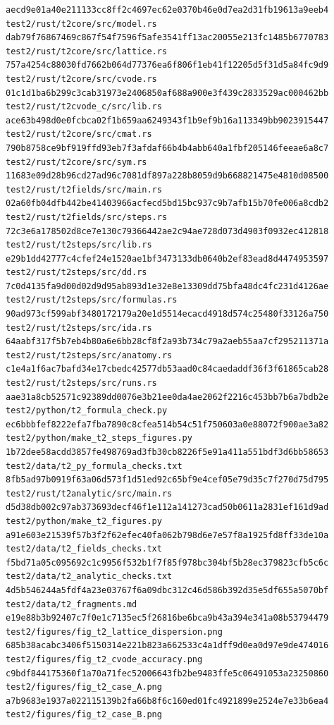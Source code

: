 \documentclass[
  10pt,
]{article}
\begin{document}
\begin{verbatim}
aecd9e01a40e211133cc8ff2c4697ec62e0370b46e0d7ea2d31fb19613a9eeb4  test2/rust/t2core/src/model.rs
dab79f76867469c867f54f7596f5afe3541ff13ac20055e213fc1485b6770783  test2/rust/t2core/src/lattice.rs
757a4254c88030fd7662b064d77376ea6f806f1eb41f12205d5f31d5a84fc9d9  test2/rust/t2core/src/cvode.rs
01c1d1ba6b299c3cab31973e2406850af688a900e3f439c2833529ac000462bb  test2/rust/t2cvode_c/src/lib.rs
ace63b498d0e0fcbca02f1b659aa6249343f1b9ef9b16a113349bb9023915447  test2/rust/t2core/src/cmat.rs
790b8758ce9bf919ffd93eb7f3afdaf66b4b4abb640a1fbf205146feeae6a8c7  test2/rust/t2core/src/sym.rs
11683e09d28b96cd27ad96c7081df897a228b8059d9b668821475e4810d08500  test2/rust/t2fields/src/main.rs
02a60fb04dfb442be41403966acfecd5bd15bc937c9b7afb15b70fe006a8cdb2  test2/rust/t2fields/src/steps.rs
72c3e6a178502d8ce7e130c79366442ae2c94ae728d073d4903f0932ec412818  test2/rust/t2steps/src/lib.rs
e29b1dd42777c4cfef24e1520ae1bf3473133db0640b2ef83ead8d4474953597  test2/rust/t2steps/src/dd.rs
7c0d4135fa9d00d02d9d95ab893d1e32e8e13309dd75bfa48dc4fc231d4126ae  test2/rust/t2steps/src/formulas.rs
90ad973cf599abf3480172179a20e1d5514ecacd4918d574c25480f33126a750  test2/rust/t2steps/src/ida.rs
64aabf317f5b7eb4b80a6e6bb28cf8f2a93b734c79a2aeb55aa7cf295211371a  test2/rust/t2steps/src/anatomy.rs
c1e4a1f6ac7bafd34e17cbedc42577db53aad0c84caedaddf36f3f61865cab28  test2/rust/t2steps/src/runs.rs
aae31a8cb52571c92389dd0076e3b21ee0da4ae2062f2216c453bb7b6a7bdb2e  test2/python/t2_formula_check.py
ec6bbbfef8222efa7fba7890c8cfea514b54c51f750603a0e88072f900ae3a82  test2/python/make_t2_steps_figures.py
1b72dee58acdd3857fe498769ad3fb30cb8226f5e91a411a551bdf3d6bb58653  test2/data/t2_py_formula_checks.txt
8fb5ad97b0919f63a06d573f1d51ed92c65bf9e4cef05e79d35c7f270d75d795  test2/rust/t2analytic/src/main.rs
d5d38db002c97ab373693decf46f1e112a141273cad50b0611a2831ef161d9ad  test2/python/make_t2_figures.py
a91e603e21539f57b3f2f62efec40fa062b798d6e7e57f8a1925fd8ff33de10a  test2/data/t2_fields_checks.txt
f5bd71a05c095692c1c9956f532b1f7f85f978bc304bf5b28ec379823cfb5c6c  test2/data/t2_analytic_checks.txt
4d5b546244a5fdf4a23e03767f6a09dbc312c46d586b392d35e5df655a5070bf  test2/data/t2_fragments.md
e19e88b3b92407c7f0e1c7135ec5f26816be6bca9b43a394e341a08b53794479  test2/figures/fig_t2_lattice_dispersion.png
685b38acabc3406f5150314e221b823a662533c4a1dff9d0ea0d97e9de474016  test2/figures/fig_t2_cvode_accuracy.png
c9bdf844175360f1a70a71fec52006643fb2be9483ffe5c06491053a23250860  test2/figures/fig_t2_case_A.png
a7b9683e1937a022115139b2fa66b8f6c160ed01fc4921899e2524e7e33b6ea4  test2/figures/fig_t2_case_B.png

\end{verbatim}
\end{document}
